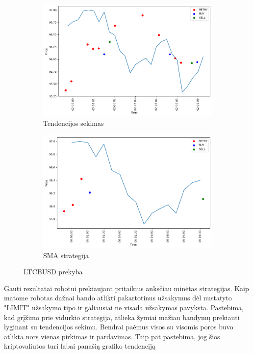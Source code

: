\documentclass{VUMIFInfKursinis}
\begin{document}
\begin{figure}[H]
  \centering
  \begin{subfigure}{.5\textwidth}
    \centering
    \includegraphics[width=\linewidth]{img/LTCBUSD_ARIMA_trades.png}
    \caption{Tendencijos sekimas}
    \label{fig:ltcbusd_arima_trades}
  \end{subfigure}%
  \begin{subfigure}{.5\textwidth}
    \centering
    \includegraphics[width=\linewidth]{img/LTCBUSD_SMA_trades.png}
    \caption{SMA strategija}
    \label{fig:ltcbusd_sma_trades}
  \end{subfigure}
  \caption{LTCBUSD prekyba}
  \label{fig:ltcbusd_trades}
\end{figure}

Gauti rezultatai robotui prekiaujant pritaikius anksčiau minėtas strategijas. Kaip matome robotas dažnai bando atlikti pakartotinus užsakymus dėl nustatyto "LIMIT" užsakymo tipo ir galiausiai ne visada užsakymas pavyksta. Pastebima, kad 
grįžimo prie vidurkio strategija, atlieka žymiai mažiau bandymų prekiauti lyginant su tendencijos sekimu. Bendrai paėmus
visos su visomis poros buvo atlikta nors vienas pirkimas ir pardavimas. Taip pat pastebima, jog šios kriptovaliutos turi 
labai panašią grafiko tendenciją 
\end{document}
